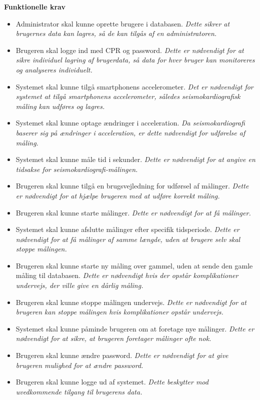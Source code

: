 \textbf{Funktionelle krav}
\begin{itemize}
    \item Administrator skal kunne oprette brugere i databasen. \textit{Dette sikrer at brugernes data kan lagres, så de kan tilgås af en administratoren.}
    \item Brugeren skal logge ind med CPR og password. \textit{Dette er nødvendigt for at sikre individuel lagring af brugerdata, så data for hver bruger kan monitoreres og analyseres individuelt.}
    \item Systemet skal kunne tilgå smartphonens accelerometer. \textit{Det er nødvendigt for systemet at tilgå smartphonens accelerometer, således seismokardiografisk måling kan udføres og lagres.}
    \item Systemet skal kunne optage ændringer i acceleration. \textit{Da seismokardiografi baserer sig på ændringer i acceleration, er dette nødvendigt for udførelse af måling.}
    \item Systemet skal kunne måle tid i sekunder. \textit{Dette er nødvendigt for at angive en tidsakse for seismokardiografi-målingen.}
    \item Brugeren skal kunne tilgå en brugsvejledning for udførsel af målinger. \textit{Dette er nødvendigt for at hjælpe brugeren med at udføre korrekt måling.}
    \item Brugeren skal kunne starte målinger. \textit{Dette er nødvendigt for at få målinger.}
    \item Systemet skal kunne afslutte målinger efter specifik tidsperiode. \textit{Dette er nødvendigt for at få målinger af samme længde, uden at brugere selv skal stoppe målingen.}
    \item Brugeren skal kunne starte ny måling over gammel, uden at sende den gamle måling til databasen. \textit{Dette er nødvendigt hvis der opstår komplikationer undervejs, der ville give en dårlig måling.}
    \item Brugeren skal kunne stoppe målingen undervejs. \textit{Dette er nødvendigt for at brugeren kan stoppe målingen hvis komplikationer opstår undervejs.}
    \item Systemet skal kunne påminde brugeren om at foretage nye målinger. \textit{Dette er nødvendigt for at sikre, at brugeren foretager målinger ofte nok.}
    \item Brugeren skal kunne ændre password. \textit{Dette er nødvendigt for at give brugeren mulighed for at ændre password.}
    \item Brugeren skal kunne logge ud af systemet. \textit{Dette beskytter mod uvedkommende tilgang til brugerens data.}
\end{itemize}

